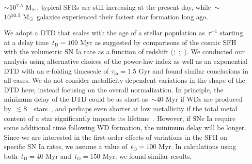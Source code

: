 \documentclass[foo.tex]{subfiles}
\begin{document}
$\sim$$10^{7.5}~\text{M}_\odot$, typical SFRs are still increasing at the present day,
while~$\sim$$10^{10.5}~\text{M}_\odot$ galaxies experienced their fastest star formation
long ago.
\par
We adopt a DTD that scales with the age of a stellar population as~$\tau^{-1}$
starting at a delay time~$t_\text{D} = 100$ Myr as suggested by comparisons of
the cosmic SFH with the volumetric SN Ia rate as a function of redshift
(\citealp{Maoz2012a};~\citealp*{Maoz2012b};~\citealp{Graur2013, Graur2014}).
We conducted our analysis using alternative choices of the power-law
index as well as an exponential DTD with an e-folding timescale of
$\tau_\text{Ia} = 1.5$ Gyr and found similar conclusions in all cases.
We do not consider metallicity-dependent variations in the shape of the DTD
here, instead focusing on the overall normalization.
In principle, the minimum delay of the DTD could be as short as~$\sim$40 Myr if
WDs are produced by~$\lesssim$8~\msun~stars~\citep*[e.g.,][]{Hurley2000}, and
perhaps even shorter at low metallicity if the total metal content of a star
significantly impacts its lifetime~\citep[e.g.,][]{Kodama1997, Vincenzo2016}.
However, if SNe Ia require some additional time following WD formation, the
minimum delay will be longer.
Since we are interested in the first-order effects of variations in the SFH on
specific SN Ia rates, we assume a value of~$t_\text{D} = 100$ Myr.
In calculations using both~$t_\text{D} = 40$ Myr and~$t_\text{D} = 150$ Myr,
we found similar results.
\par
\end{document}
